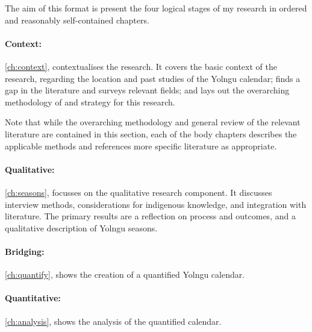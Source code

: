 The aim of this format is present the four logical stages of my research
in ordered and reasonably self-contained chapters.

\paragraph{Context:}
\autoref{ch:context}, \textit{} contextualises the research.
It covers the basic context of the research,
regarding the location and past studies of the Yolngu calendar;
finds a gap in the literature and surveys relevant fields;
and lays out the overarching methodology of and strategy for this research.

Note that while the overarching methodology and general review of the relevant literature
are contained in this section, each of the body chapters describes the applicable methods
and references more specific literature as appropriate.


\paragraph{Qualitative:}
\autoref{ch:seasons}, \textit{} focusses on the qualitative research component.
It discusses interview methods, considerations for indigenous knowledge, and integration with literature.
The primary results are a reflection on process and outcomes,
and a qualitative description of Yolngu seasons.


\paragraph{Bridging:}
\autoref{ch:quantify}, \textit{} shows the creation of a quantified Yolngu calendar.


\paragraph{Quantitative:}
\autoref{ch:analysis}, \textit{} shows the analysis of the quantified calendar.

